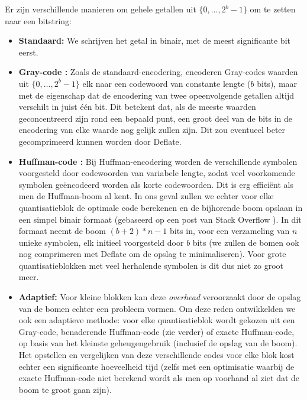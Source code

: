 Er zijn verschillende manieren om gehele getallen uit $\{0, \dots, 2^b - 1\}$ om te zetten naar een bitstring:
\begin{itemize}

\item \textbf{Standaard:} We schrijven het getal in binair, met de meest significante bit eerst.

\item \textbf{Gray-code \cite{ref:graycode}:} Zoals de standaard-encodering, encoderen Gray-codes waarden uit $\{0, \dots, 2^b - 1\}$ elk naar een codewoord van constante lengte ($b$ bits), maar met de eigenschap dat de encodering van twee opeenvolgende getallen altijd verschilt in juist \'e\'en bit. Dit betekent dat, als de meeste waarden geconcentreerd zijn rond een bepaald punt, een groot deel van de bits in de encodering van elke waarde nog gelijk zullen zijn. Dit zou eventueel beter gecomprimeerd kunnen worden door Deflate.

\item \textbf{Huffman-code \cite{ref:huffman_coding}:} Bij Huffman-encodering worden de verschillende symbolen voorgesteld door codewoorden van variabele lengte, zodat veel voorkomende symbolen ge\"encodeerd worden als korte codewoorden. Dit is erg effici\"ent als men de Huffman-boom al kent. In ons geval zullen we echter voor elke quantisatieblok de optimale code berekenen en de bijhorende boom opslaan in een simpel binair formaat (gebaseerd op een post van Stack Overflow \cite{ref:huffman_tree}). In dit formaat neemt de boom $(b + 2)*n - 1$ bits in, voor een verzameling van $n$ unieke symbolen, elk initieel voorgesteld door $b$ bits (we zullen de bomen ook nog comprimeren met Deflate om de opslag te minimaliseren). Voor grote quantisatieblokken met veel herhalende symbolen is dit dus niet zo groot meer.

\item \textbf{Adaptief:} Voor kleine blokken kan deze \textit{overhead} veroorzaakt door de opslag van de bomen echter een probleem vormen. Om deze reden ontwikkelden we ook een adaptieve methode: voor elke quantisatieblok wordt gekozen uit een Gray-code, benaderende Huffman-code (zie verder) of exacte Huffman-code, op basis van het kleinste geheugengebruik (inclusief de opslag van de boom). Het opstellen en vergelijken van deze verschillende codes voor elke blok kost echter een significante hoeveelheid tijd (zelfs met een optimisatie waarbij de exacte Huffman-code niet berekend wordt als men op voorhand al ziet dat de boom te groot gaan zijn).\\


\end{itemize}
